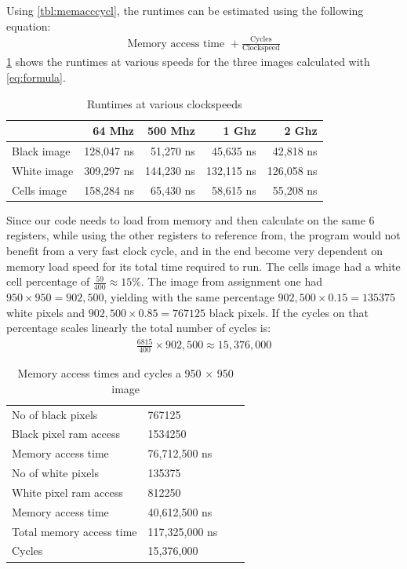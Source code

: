 \documentclass[a4paper, english]{article}
\numberwithin{equation}{section}
\begin{document}
Using \cref{tbl:memacccycl}, the runtimes can be estimated using the following equation:
\begin{align}
    \text{Memory access time } + \frac{\text{Cycles}}{\text{Clockspeed}}\label{eq:formula}
\end{align}
\cref{tbl:GHZ} shows the runtimes at various speeds for the three images calculated with \cref{eq:formula}.
\begin{table}[H]
    \centering
    \caption{Runtimes at various clockspeeds}\label{tbl:GHZ}
    \begin{tabular}{lrrrr}
        \toprule
                    & 64 Mhz     & 500 Mhz    & 1 Ghz      & 2 Ghz      \\
        \midrule
        Black image & 128,047 ns & 51,270 ns  & 45,635 ns  & 42,818 ns  \\
        White image & 309,297 ns & 144,230 ns & 132,115 ns & 126,058 ns \\
        Cells image & 158,284 ns & 65,430 ns  & 58,615 ns  & 55,208 ns  \\
        \bottomrule
    \end{tabular}
\end{table}
Since our code needs to load from memory and then calculate on the same 6 registers, while using the other registers to reference from, the program would not benefit from a very fast clock cycle, and in the end become very dependent on memory load speed for its total time required to run.\newline
The cells image had a white cell percentage of \(\frac{59}{400} \approx 15 \%\). The image from assignment one had \(950 \times 950 = 902,500\), yielding with the same percentage \(902,500 \times 0.15 = 135375\) white pixels and \(902,500 \times 0.85 = 767125\) black pixels. If the cycles on that percentage scales linearly the total number of cycles is:
\begin{align}
    \frac{6815}{400} \times 902,500 \approx 15,376,000
\end{align}
\begin{table}[H]
    \centering
    \caption{Memory access times and cycles a 950 \(\times\) 950 image}\label{tbl:950}
    \begin{tabular}{llll}
        \toprule
        No of black pixels       & 767125         \\
        Black pixel ram access   & 1534250        \\
        Memory access time       & 76,712,500 ns  \\
        \midrule
        No of white pixels       & 135375         \\
        White pixel ram access   & 812250         \\
        Memory access time       & 40,612,500 ns  \\
        \midrule
        Total memory access time & 117,325,000 ns \\
        Cycles                   & 15,376,000     \\
        \bottomrule
    \end{tabular}
\end{table}
\end{document}
